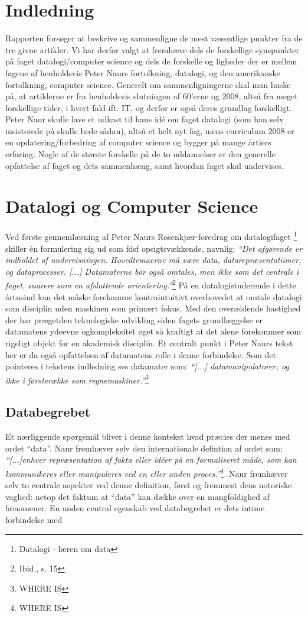 \documentclass[10pt,a4paper]{article}
\newcommand{\citat}[2]{\vspace{0.1cm}\newline\textit{``#1''}\hspace{0.1cm}\footnote{#2}\vspace{0.1cm}\newline}
\begin{document}
\section{Indledning}
Rapporten forsøger at beskrive og sammenligne de mest væsentlige punkter fra de
tre givne artikler. Vi har derfor valgt at fremhæve dels de forskellige
synspunkter på faget datalogi/computer science og dels de forskelle og ligheder
der er mellem fagene af henholdsvis Peter Naurs fortolkning, datalogi, og den
amerikanske fortolkning, computer science.  Generelt om sammenligningerne skal
man huske på, at artiklerne er fra henholdsvis slutningen af 60'erne og 2008,
altså fra meget forskellige tider, i hvert fald ift. IT, og derfor er også deres
grundlag forskelligt. Peter Naur skulle lave et udkast til hans idé om faget
datalogi (som han selv insisterede på skulle hede sådan), altså et helt nyt fag,
mens curriculum 2008 er en opdatering/forbedring af computer science og bygger
på mange årtiers erfaring.  Nogle af de største forskelle på de to uddannelser
er den generelle opfattelse af faget og dets sammenhæng, samt hvordan faget skal
undervises.

\section{Datalogi og Computer Science}
Ved første gennemlæsning af Peter Naurs Rosenkjær-foredrag om datalogifaget
\footnote{Datalogi - læren om data}
skiller én formulering sig ud som fdsf opsigtsvækkende, navnlig:
\citat{Det afgørende er indholdet af undervisningen.  Hovedtemaerne må være
    data, datarepræsentationer, og dataprocesser. [...] Datamaterne bør også
    omtales, men ikke som det centrale i faget, snarere som en afsluttende
    orientering.}{Ibid., s. 15} På en datalogistuderende i dette årtusind kan det
måske forekomme kontraintuitivt overhovedet at omtale datalogi som disciplin
uden maskinen som primært fokus. Med den overældende hastighed der har prægetden
teknologiske udvikling siden fagets grundlæggelse er datamatens ydeevne
ogkompleksitet øget så kraftigt at det alene forekommer som rigeligt objekt
for en akademisk disciplin. Et centralt punkt i Peter Naurs tekst her er da også
opfattelsen af datamatens rolle i denne forbindelse. Som det pointeres i
tekstens indledning ses datamater som:
\citat{[...] datamanipulatorer, og ikke i førsterække som regnemaskiner.}{WHERE
    IS}
 
\subsection{Databegrebet}
Et nærliggende spørgsmål bliver i denne kontekst hvad præcies der menes med
ordet ``data''. Naur fremhæver selv den internationale defintion af ordet som:
\citat{[...]enhver repræsentation af fakta eller idéer på en formaliseret måde, som
    kan kommunikeres eller manipuleres ved en eller anden proces.}{WHERE IS}.
Naur fremhæver selv to centrale aspekter ved denne definition, først og fremmest
dens notoriske vaghed: netop det faktum at ``data'' kan dække over en
mangfoldighed af fænomener. En anden central egenskab ved databegrebet er dets
intime forbindelse med 
\end{document}
